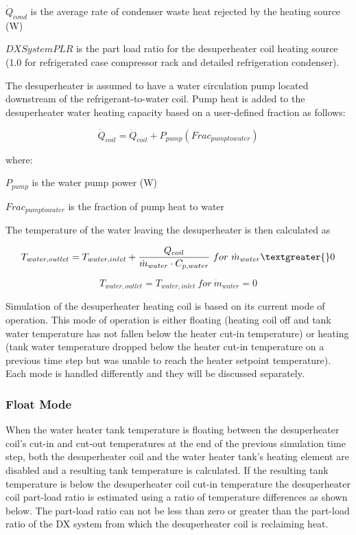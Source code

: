 \({\dot Q_{cond}}\) is the average rate of condenser waste heat rejected by the heating source (W)

\(DXSystemPLR\) is the part load ratio for the desuperheater coil heating source (1.0 for refrigerated case compressor rack and detailed refrigeration condenser).

The desuperheater is assumed to have a water circulation pump located downstream of the refrigerant-to-water coil. Pump heat is added to the desuperheater water heating capacity based on a user-defined fraction as follows:

\begin{equation}
{\dot Q_{coil}} = {\dot Q_{coil}} + {P_{pump}}\left( {Fra{c_{pumptowater}}} \right)
\end{equation}

where:

\({P_{pump}}\) is the water pump power (W)

\(Fra{c_{pumptowater}}\) is the fraction of pump heat to water

The temperature of the water leaving the desuperheater is then calculated as

\begin{equation}
{T_{water,outlet}} = {T_{water,inlet}} + \frac{{{Q_{coil}}}}{{{{\dot m}_{water}}\cdot {C_{p,water}}}} ~for~ {\dot m_{water}} \textgreater{} 0
\end{equation}

\begin{equation}
{T_{water,outlet}} = {T_{water,inlet}} ~for~ {\dot m_{water}} = 0
\end{equation}

Simulation of the desuperheater heating coil is based on its current mode of operation. This mode of operation is either floating (heating coil off and tank water temperature has not fallen below the heater cut-in temperature) or heating (tank water temperature dropped below the heater cut-in temperature on a previous time step but was unable to reach the heater setpoint temperature). Each mode is handled differently and they will be discussed separately.

\subsubsection{Float Mode}\label{float-mode}

When the water heater tank temperature is floating between the desuperheater coil's cut-in and cut-out temperatures at the end of the previous simulation time step, both the desuperheater coil and the water heater tank's heating element are disabled and a resulting tank temperature is calculated. If the resulting tank temperature is below the desuperheater coil cut-in temperature the desuperheater coil part-load ratio is estimated using a ratio of temperature differences as shown below. The part-load ratio can not be less than zero or greater than the part-load ratio of the DX system from which the desuperheater coil is reclaiming heat.

